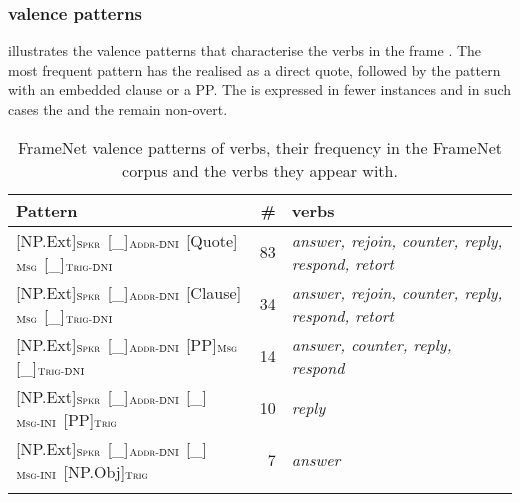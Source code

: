 \documentclass[output=paper,colorlinks,citecolor=brown]{langscibook}
\begin{document}
\subsubsection{ valence patterns}

 illustrates the valence patterns that characterise the verbs in the frame . The most frequent pattern has the  realised as a direct quote, followed by the pattern with an embedded clause or a PP. The  is expressed in fewer instances and in such cases the  and the  remain non-overt.


\begin{table}
    \centering\footnotesize
    \begin{tabularx}{\textwidth}{ lrQ }
\lsptoprule
         Pattern  & \#  & verbs \\
\midrule
{[NP.Ext]}$_{\text{\textsc{Spkr}}}$ {[\_]}$_{\text{\textsc{Addr-DNI}}}$ {[Quote]}$_{\text{\textsc{Msg}}}$  {[\_]}$_{\text{\textsc{Trig-DNI}}}$  & 83 & \textit{answer, rejoin, counter, reply, respond, retort}\\

{[NP.Ext]}$_{\text{\textsc{Spkr}}}$ {[\_]}$_{\text{\textsc{Addr-DNI}}}$ {[Clause]}$_{\text{\textsc{Msg}}}$   {[\_]}$_{\text{\textsc{Trig-DNI}}}$  & 34 & \textit{answer, rejoin, counter, reply, respond, retort}\\


{[NP.Ext]}$_{\text{\textsc{Spkr}}}$ {[\_]}$_{\text{\textsc{Addr-DNI}}}$ {[PP]}$_{\text{\textsc{Msg}}}$ {[\_]}$_{\text{\textsc{Trig-DNI}}}$  & 14 & \textit{answer, counter, reply, respond}\\

{[NP.Ext]}$_{\text{\textsc{Spkr}}}$ {[\_]}$_{\text{\textsc{Addr-DNI}}}$ {[\_]}$_{\text{\textsc{Msg-INI}}}$ {[PP]}$_{\text{\textsc{Trig}}}$  & 10 & \textit{reply}\\


{[NP.Ext]}$_{\text{\textsc{Spkr}}}$ {[\_]}$_{\text{\textsc{Addr-DNI}}}$ {[\_]}$_{\text{\textsc{Msg-INI}}}$ {[NP.Obj]}$_{\text{\textsc{Trig}}}$  & 7 & \textit{answer}\\
\lspbottomrule
    \end{tabularx}
    \caption{FrameNet valence patterns of  verbs, their frequency in the FrameNet corpus and the verbs they appear with.}
    \label{tbl:response-valence}
\end{table} 
\end{document}
